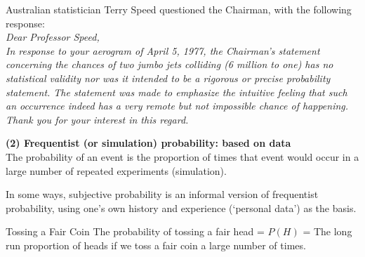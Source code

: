 \documentclass[t,xcolor=pdftex,dvipsnames,table]{beamer}\usepackage[]{graphicx}\usepackage[]{color}
\begin{document}
\begin{frame}{}
Australian statistician Terry Speed questioned the Chairman, with the following response: \\

\vspace{.5cm}
{\it Dear Professor Speed, \\
In response to your aerogram of April 5, 1977, the
Chairman’s statement concerning the chances of two
jumbo jets colliding (6 million to one) has no statistical
validity nor was it intended to be a rigorous or precise
probability statement. The statement was made to
emphasize the intuitive feeling that such an occurrence
indeed has a very remote but not impossible chance of
happening.
Thank you for your interest in this regard.}
\end{frame}



\begin{frame}{}

{\bf (2) Frequentist (or simulation) probability: based on data} \\
The probability of an event is the proportion of times that event would occur in a large number of repeated experiments (simulation).

\vspace{.5cm}
In some ways, subjective probability is an informal version of frequentist probability, using one's own history and experience (`personal data') as the basis.

\vspace{.5cm}
\begin{block}{Tossing a Fair Coin}
The probability of tossing a fair head =  $P(H)$ = The long run proportion of heads if we toss a fair coin a large number of times.
\end{block}
\end{frame}
\end{document}
